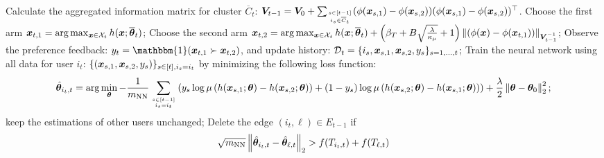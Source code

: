 \begin{algorithm*}[h]
\begin{algorithmic}[1]
            \STATE Calculate the aggregated information matrix for cluster $\overline C_t$: $\boldsymbol{V}_{t-1}=\boldsymbol{V}_0+\sum_{s\in[t-1]\atop i_s\in \overline C_t} (\phi(\boldsymbol{x}_{s,1}) - \phi(\boldsymbol{x}_{s,2}))(\phi(\boldsymbol{x}_{s,1}) - \phi(\boldsymbol{x}_{s,2}))^\top$. 
            \STATE Choose the first arm  $\boldsymbol{x}_{t,1} = \arg\max_{\boldsymbol{x}\in\mathcal{X}_t} h(\boldsymbol{x};\overline{\boldsymbol{\theta}}_t)$; 
            \STATE Choose the second arm $\boldsymbol{x}_{t,2} = \arg\max_{\boldsymbol{x}\in\mathcal{X}_t} h(\boldsymbol{x};\overline{\boldsymbol{\theta}}_t) + \left( \beta_T + B\sqrt{\frac{\lambda}{\kappa_\mu}} + 1 \right) \left\| \left(\phi(\boldsymbol{x}) - \phi(\boldsymbol{x}_{t,1})\right) \right\|_{\boldsymbol{V}_{t-1}^{-1}}$; 
		\STATE Observe the preference feedback: $y_t = \mathbbm{1}(\bx_{t,1}\succ \bx_{t,2})$, and update history: $\mathcal{D}_t=\{i_s, \boldsymbol{x}_{s,1}, \boldsymbol{x}_{s,2}, y_s\}_{s=1,\ldots,t}$;
        \STATE Train the neural network using all data for user $i_t$: $\{(\boldsymbol{x}_{s,1}, \boldsymbol{x}_{s,2}, y_s)\}_{s\in[t], i_s = i_t}$ by minimizing the following loss function:
            \begin{equation}
                \hat{\boldsymbol{\theta}}_{i_t,t}=\arg\min_{\boldsymbol{\theta}} 
                - \frac{1}{m_{\text{NN}}} \sum_{s\in[t-1]\atop i_s = i_t}\left( y_s\log\mu\left( h(\boldsymbol{x}_{s,1};\boldsymbol{\theta}) - h(\boldsymbol{x}_{s,2};\boldsymbol{\theta}) \right) + (1-y_s)\log\mu\left(h(\boldsymbol{x}_{s,2};\boldsymbol{\theta}) - h(\boldsymbol{x}_{s,1};\boldsymbol{\theta})\right) \right)+ \frac{\lambda}{2}\left\| \boldsymbol{\theta} - \boldsymbol{\theta}_0 \right\|_2^2;
                \label{eq:loss:func:individial}
            \end{equation}
            keep the estimations of other users unchanged;
            \STATE Delete the edge $(i_t,\ell)\in E_{t-1}$ if
            \begin{equation}
                \sqrt{m_{\text{NN}}}\left\| \hat{\boldsymbol{\theta}}_{i_t,t}-\hat{\boldsymbol{\theta}}_{\ell,t} \right\|_2>f(T_{i_t,t})+f(T_{\ell,t})
            \end{equation} 
		\ENDFOR
	\end{algorithmic}
\end{algorithm*}





